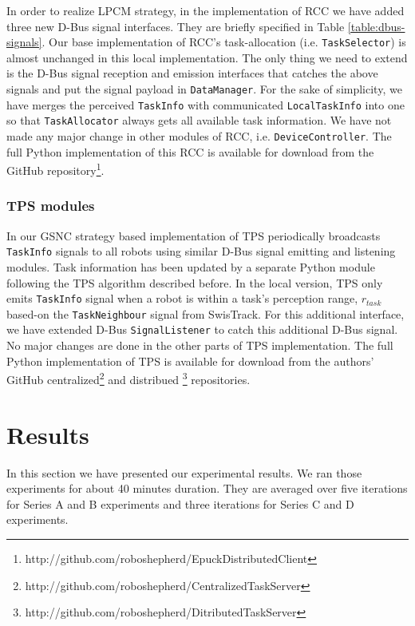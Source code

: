 \documentclass[journal]{IEEEtran}
\begin{document}
%
In order to realize LPCM strategy, in the implementation of RCC we have added three new D-Bus signal interfaces. They are briefly specified in Table \ref{table:dbus-signals}. Our base implementation of RCC's task-allocation (i.e. \texttt{TaskSelector}) is almost unchanged in this local implementation. The only thing we need to extend is the D-Bus signal reception and emission interfaces that catches the above signals and put the signal payload in \texttt{DataManager}. For the sake of simplicity, we have merges the perceived \texttt{TaskInfo} with communicated \texttt{LocalTaskInfo} into one so that \texttt{TaskAllocator} always gets all available task information. We have not made any major change in other modules of RCC, i.e. \texttt{DeviceController}. The full Python implementation of this RCC is available for download from the GitHub repository\footnote{http://github.com/roboshepherd/EpuckDistributedClient }.
\subsubsection{TPS modules}
In our GSNC strategy based implementation of TPS periodically broadcasts \texttt{TaskInfo} signals to all robots using similar D-Bus signal emitting and listening modules. Task information has been updated by a separate Python module following the TPS algorithm described before. In the local version, TPS only emits \texttt{TaskInfo} signal when a robot is within a task's perception range, $r_{task}$ based-on the \texttt{TaskNeighbour} signal from SwisTrack. For this additional interface, we have extended D-Bus \texttt{SignalListener} to catch this additional D-Bus signal.  No major changes are done in the other parts of TPS implementation. The full Python implementation of TPS is available for download from the authors' GitHub centralized\footnote{http://github.com/roboshepherd/CentralizedTaskServer}
and distribued \footnote{http://github.com/roboshepherd/DitributedTaskServer} repositories.
\section{Results}
\label{sec:results}
In this section we have presented our experimental results. We ran those experiments for about 40 minutes duration.  They are averaged over five iterations for Series A and B experiments and three iterations for Series C and D experiments. 
\end{document}
